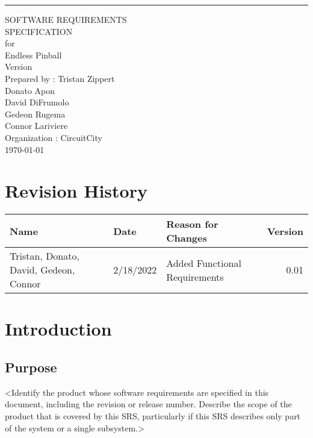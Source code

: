 \documentclass[11pt]{article}
\date{}
\title{}
\begin{document}
\begin{flushright}
    \rule{16cm}{5pt}\vskip1cm
    \begin{bfseries}
        \Huge{SOFTWARE REQUIREMENTS\\ SPECIFICATION}\\
        \vspace{1.5cm}
        for\\
        \vspace{1.5cm}
        Endless Pinball\\
        \vspace{1.5cm}
        \LARGE{Version \myversion}\\
        \vspace{1.5cm}
        Prepared by : Tristan Zippert\\
    Donato Apon \\
     David DiFrumolo\\
       Gedeon Rugema\\
    Connor Lariviere\\ 
        \vspace{1.5cm}
        Organization : CircuitCity\\
        \vspace{1.5cm}
        \today\\
    \clearpage
    \end{bfseries}
\end{flushright}
\tableofcontents
\section*{Revision History}
\label{sec:orgaef73a0}
\begin{center}
\begin{tabular}{lllr}
Name & Date & Reason for Changes & Version\\
\hline
Tristan, Donato, David, Gedeon, Connor & 2/18/2022 & Added Functional Requirements & 0.01\\
\end{tabular}
\end{center}

\section{Introduction}
\label{sec:org7a998c5}
\subsection{Purpose}
\label{sec:orgfb60f87}
<Identify the product whose software requirements are specified in this document, including the
revision or release number. Describe the scope of the product that is covered by this SRS,
particularly if this SRS describes only part of the system or a single subsystem.>
\end{document}
